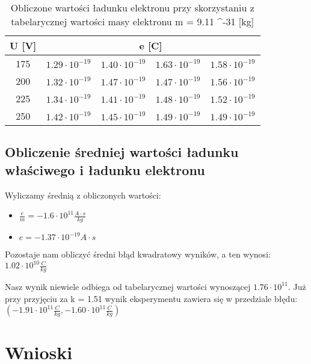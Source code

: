 \documentclass{article}
\begin{document}
\begin{table}[htbp]
\centering
\begin{tabular}{|c|r|r|r|r|}
\hline
U [V] & \multicolumn{4}{|c|}{e [C]} \\ \hline
175 & $1.29 \cdot 10^{-19}$ & $1.40 \cdot 10^{-19}$ & $1.63 \cdot 10^{-19}$ & $1.58 \cdot 10^{-19}$ \\ \hline
200 & $1.32 \cdot 10^{-19}$ &$1.47 \cdot 10^{-19}$ & $1.47 \cdot 10^{-19}$ & $1.56 \cdot 10^{-19}$ \\ \hline
225 & $1.34 \cdot 10^{-19}$ & $1.41 \cdot 10^{-19}$ & $1.48 \cdot 10^{-19}$ & $1.52 \cdot 10^{-19}$ \\ \hline
250 & $1.42 \cdot 10^{-19}$ & $1.45 \cdot 10^{-19}$ & $1.49 \cdot 10^{-19}$ & $1.49 \cdot 10^{-19}$ \\ \hline
\end{tabular}
\caption{Obliczone wartości ładunku elektronu przy skorzystaniu z tabelarycznej wartości masy elektronu m = 9.11 ^{-31} [kg]}
\label{}
\end{table}

\subsection{Obliczenie średniej wartości ładunku właściwego i ładunku elektronu}

Wyliczamy średnią z obliczonych wartości:
\begin{itemize}
\item $\frac{e}{m} = -1.6 \cdot 10^{11} \frac{A \cdot s}{kg}$
\item $e = -1.37 \cdot 10^{-19} A \cdot s$
\end{itemize}

Pozostaje nam obliczyć średni błąd kwadratowy wyników, a ten wynosi: $1.02 \cdot 10^{10} \frac{C}{kg}$

Nasz wynik niewiele odbiega od tabelarycznej wartości wynoszącej $1.76 \cdot 10^{11}$. Już przy przyjęciu za k = 1.51 wynik eksperymentu zawiera się w przedziale błędu: $(-1.91 \cdot 10^{11} \frac{C}{kg}, -1.60 \cdot 10^{11} \frac{C}{kg})$

\section{Wnioski}
\end{document}
